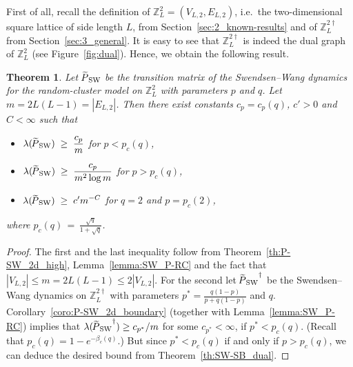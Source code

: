 \documentclass{dis}
\newtheorem{theorem}{Theorem}[chapter]
\theoremstyle{citing}
\begin{document}
First of all, recall the definition of ${\ensuremath{\mathbb{Z}}}_L^2=(V_{L,2},E_{L,2})$, 
i.e.~the two-dimensional square lattice of side length $L$, 
from Section~\ref{sec:2_known-results} and of 
${\ensuremath{\mathbb{Z}}}_L^{2\dag}$ from Section~\ref{sec:3_general}.
It is easy to see that ${\ensuremath{\mathbb{Z}}}_L^{2\dag}$ is indeed 
the dual graph of ${\ensuremath{\mathbb{Z}}}_L^{2}$ (see Figure~\ref{fig:dual}).
Hence, we obtain the following result.

\vspace{1mm}

\begin{theorem} \label{th:SW_square}
Let ${{\raisebox{2pt}{ ${\widetilde{{}}}$ }\mkern-14mu P}_{\rm SW}}$ be the transition matrix of the 
Swendsen--Wang dynamics for the random-cluster model 
on ${\ensuremath{\mathbb{Z}}}^2_L$ with parameters $p$ and $q$. 
Let $m=2L(L-1)={\left\vert {E_{L,2}} \right\vert}$. 
Then there exist constants $c_p=c_p(q)$, $c'>0$ and $C<\infty$ 
such that 
\begin{itemize}
\item\quad $\displaystyle \lambda({{\raisebox{2pt}{ ${\widetilde{{}}}$ }\mkern-14mu P}_{\rm SW}}) \;\ge\; \frac{c_p }{m}$ 
			\qquad\qquad\quad for $p < p_c(q)$, \vspace{1mm}
\item\quad $\displaystyle \lambda({{\raisebox{2pt}{ ${\widetilde{{}}}$ }\mkern-14mu P}_{\rm SW}}) \;\ge\; \frac{c_p}{m^2 \log m}$ 
			\qquad for $p > p_c(q)$, \vspace{1mm}
\item\quad $\displaystyle \lambda({{\raisebox{2pt}{ ${\widetilde{{}}}$ }\mkern-14mu P}_{\rm SW}}) \;\ge\; c' m^{-C}$ 
			\qquad\quad for $q=2$ and $p = p_c(2)$,
\end{itemize}
where $p_c(q)\,=\,\frac{\sqrt{q}}{1+\sqrt{q}}$.
\end{theorem}
\vspace{1mm}

\begin{proof}
The first and the last inequality follow from 
Theorem~\ref{th:P-SW_2d_high}, Lemma~\ref{lemma:SW_P-RC} and the 
fact that ${\left\vert {V_{L,2}} \right\vert}\le m=2L(L-1)\le2{\left\vert {V_{L,2}} \right\vert}$. 
For the second let ${{\raisebox{2pt}{ ${\widetilde{{}}}$ }\mkern-14mu P}_{\rm SW}}^\dag$ be the Swendsen--Wang dynamics on 
${\ensuremath{\mathbb{Z}}}_L^{2\dag}$ with parameters $p^*=\frac{q(1-p)}{p+q(1-p)}$ and $q$.
Corollary~\ref{coro:P-SW_2d_boundary} 
(together with Lemma~\ref{lemma:SW_P-RC}) 
implies that $\lambda({{\raisebox{2pt}{ ${\widetilde{{}}}$ }\mkern-14mu P}_{\rm SW}}^\dag) \ge c_{p^*}/{m}$ for some 
$c_{p^*}<\infty$, if $p^*<p_c(q)$. 
(Recall that $p_c(q)=1-e^{-\beta_c(q)}$.)
But since $p^*<p_c(q)$ if and only if $p>p_c(q)$, we can 
deduce the desired bound from Theorem~\ref{th:SW-SB_dual}.
\end{proof}
\vspace{1mm}
\end{document}
